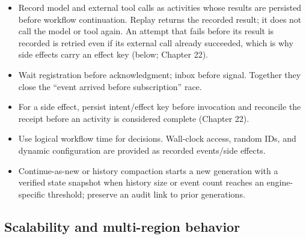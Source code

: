\begin{itemize}

\item Record model and external tool calls as activities whose results are persisted before workflow continuation. Replay returns the recorded result; it does not call the model or tool again. An attempt that fails before its result is recorded is retried even if its external call already succeeded, which is why side effects carry an effect key (below; Chapter 22).

\item Wait registration before acknowledgment; inbox before signal. Together they close the “event arrived before subscription” race.

\item For a side effect, persist intent/effect key before invocation and reconcile the receipt before an activity is considered complete (Chapter 22).

\item Use logical workflow time for decisions. Wall-clock access, random IDs, and dynamic configuration are provided as recorded events/side effects.

\item Continue-as-new or history compaction starts a new generation with a verified state snapshot when history size or event count reaches an engine-specific threshold; preserve an audit link to prior generations.

\end{itemize}

\subsection{Scalability and multi-region behavior}

